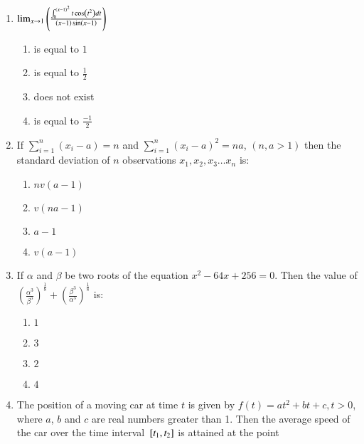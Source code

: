 \documentclass[journal]{IEEEtran}
\begin{document}
\begin{enumerate}
    \item $\lim_{x \rightarrow 1} \left(\frac{\int_{0}^{\left(x-1\right)^2} t \cos \left(t^2\right) dt}{\left(x-1\right)\sin\left(x-1\right)}\right)$
    
    \begin{multicols}{4}
    \begin{enumerate}
        \item is equal to $1$
        \item is equal to $\frac{1}{2}$
        \item does not exist
        \item is equal to $\frac{-1}{2}$
    \end{enumerate}
    \end{multicols}
    
    \item If $\sum_{i=1}^{n}(x_i - a) = n$ and $\sum_{i=1}^{n} (x_i - a)^2 = na$, $(n,a >1)$ then the standard deviation of $n$ observations $x_1, x_2, x_3\ldots x_n$ is:
    
    \begin{multicols}{4}
    \begin{enumerate}
        \item $nv(a-1)$
        \item $v(na-1)$
        \item $a-1$
        \item $v(a-1)$
    \end{enumerate}
    \end{multicols}
    
    \item If $\alpha$ and $\beta$ be two roots of the equation $x^2 -64x+256 = 0$. Then the value of $(\frac{\alpha^3}{\beta^5})^\frac{1}{8}+(\frac{\beta^3}{\alpha^5})^\frac{1}{8}$ is:

    \begin{multicols}{4}
    \begin{enumerate}
        \item $1$
        \item $3$
        \item $2$
        \item $4$
    \end{enumerate}
    \end{multicols}
    
    \item The position of a moving car at time $t$ is given by $f(t) = at^2+bt+c, t > 0$, where $a$, $b$ and $c$ are real numbers greater than 1. Then the average speed of the car over the time interval ${}\left[t_1, t_2\right]$ is attained at the point


\end{enumerate}
\end{document}
